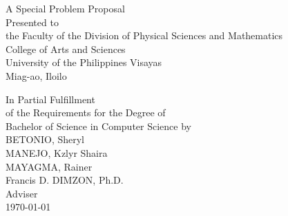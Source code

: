 \begin{titlepage}
\centering


\vspace{1.75cm}
A Special Problem Proposal\\
Presented to\\
the Faculty of the Division of Physical Sciences and Mathematics\\
College of Arts and Sciences\\
University of the Philippines Visayas\\
Miag-ao, Iloilo

\vspace{1.75cm}
In Partial Fulfillment\\
of the Requirements for the Degree of\\
Bachelor of Science in Computer Science
\vspace{1.75cm}
by\\

\vspace{1cm}
BETONIO, Sheryl  \\
MANEJO, Kzlyr Shaira  \\
MAYAGMA, Rainer  \\

\vspace{1.75cm}
Francis D. DIMZON, Ph.D. \\
Adviser\\

\vspace{1.75cm}
\today
\end{titlepage}
